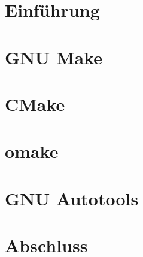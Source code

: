 \documentclass{beamer}
\begin{document}
	\section{Einführung}
	

	\section{GNU Make}
	\section{CMake}
	\section{omake}
	\section{GNU Autotools}

	\section{Abschluss}
	
\end{document}
